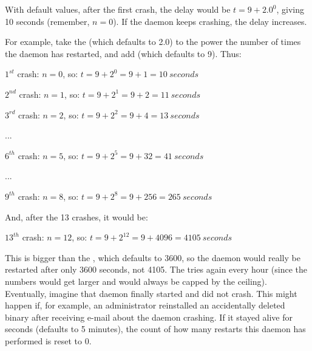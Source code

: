 With default values, after the first crash, the delay would be $t = 9
+ 2.0^0$, giving 10 seconds (remember, $n = 0$).  If the daemon keeps
crashing, the delay increases.

For example, take the  (which defaults
to 2.0) to the power the number of times the daemon has restarted, and add
 (which defaults to 9).
Thus:

 $1^{st}$ crash:  $n = 0$, so: $t = 9 + 2^0 = 9 + 1 = 10\ seconds$

 $2^{nd}$ crash:  $n = 1$, so: $t = 9 + 2^1 = 9 + 2 = 11\ seconds$

 $3^{rd}$ crash:  $n = 2$, so: $t = 9 + 2^2 = 9 + 4 = 13\ seconds$

    ...

 $6^{th}$ crash:  $n = 5$, so: $t = 9 + 2^5 = 9 + 32 = 41\ seconds$

    ...

 $9^{th}$ crash:  $n = 8$, so: $t = 9 + 2^8 = 9 + 256 = 265\ seconds$

And, after the 13 crashes, it would be:

 $13^{th}$ crash:  $n = 12$, so: $t = 9 + 2^{12} = 9 + 4096 = 4105\ seconds$

This is bigger than the , which
defaults to 3600, so the daemon would really be restarted after only
3600 seconds, not 4105.
The  tries again every hour (since the numbers would
get larger and would always be capped by the ceiling).
Eventually, imagine that daemon finally started and did not crash.
This might happen if, for example, an administrator reinstalled
an accidentally deleted binary after receiving e-mail about
the daemon crashing.
If it stayed alive for
 seconds (defaults to 5 minutes),
the count of how many restarts this daemon has performed is reset to
0.

